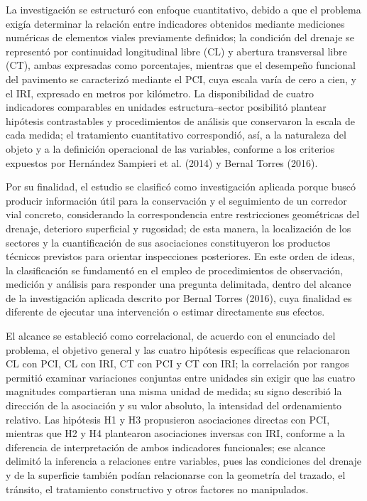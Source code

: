 

La investigación se estructuró con enfoque cuantitativo, debido a que el problema exigía determinar la relación entre indicadores obtenidos mediante mediciones numéricas de elementos viales previamente definidos; la condición del drenaje se representó por continuidad longitudinal libre (CL) y abertura transversal libre (CT), ambas expresadas como porcentajes, mientras que el desempeño funcional del pavimento se caracterizó mediante el PCI, cuya escala varía de cero a cien, y el IRI, expresado en metros por kilómetro. La disponibilidad de cuatro indicadores comparables en unidades estructura–sector posibilitó plantear hipótesis contrastables y procedimientos de análisis que conservaron la escala de cada medida; el tratamiento cuantitativo correspondió, así, a la naturaleza del objeto y a la definición operacional de las variables, conforme a los criterios expuestos por Hernández Sampieri et al. (2014) y Bernal Torres (2016).

Por su finalidad, el estudio se clasificó como investigación aplicada porque buscó producir información útil para la conservación y el seguimiento de un corredor vial concreto, considerando la correspondencia entre restricciones geométricas del drenaje, deterioro superficial y rugosidad; de esta manera, la localización de los sectores y la cuantificación de sus asociaciones constituyeron los productos técnicos previstos para orientar inspecciones posteriores. En este orden de ideas, la clasificación se fundamentó en el empleo de procedimientos de observación, medición y análisis para responder una pregunta delimitada, dentro del alcance de la investigación aplicada descrito por Bernal Torres (2016), cuya finalidad es diferente de ejecutar una intervención o estimar directamente sus efectos.

El alcance se estableció como correlacional, de acuerdo con el enunciado del problema, el objetivo general y las cuatro hipótesis específicas que relacionaron CL con PCI, CL con IRI, CT con PCI y CT con IRI; la correlación por rangos permitió examinar variaciones conjuntas entre unidades sin exigir que las cuatro magnitudes compartieran una misma unidad de medida; su signo describió la dirección de la asociación y su valor absoluto, la intensidad del ordenamiento relativo. Las hipótesis H1 y H3 propusieron asociaciones directas con PCI, mientras que H2 y H4 plantearon asociaciones inversas con IRI, conforme a la diferencia de interpretación de ambos indicadores funcionales; ese alcance delimitó la inferencia a relaciones entre variables, pues las condiciones del drenaje y de la superficie también podían relacionarse con la geometría del trazado, el tránsito, el tratamiento constructivo y otros factores no manipulados.

